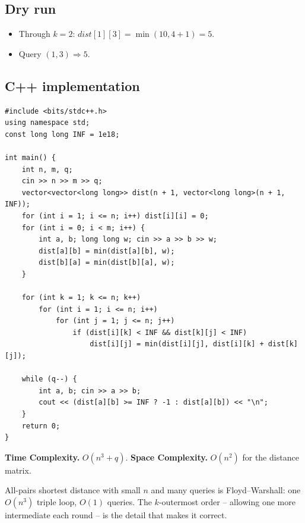 \subsection*{Dry run}


\begin{itemize}
  \item Through $k=2$: $\textit{dist}[1][3]=\min(10,4+1)=5$.
  \item Query $(1,3)\Rightarrow5$.
\end{itemize}

\subsection*{C++ implementation}

\begin{lstlisting}
#include <bits/stdc++.h>
using namespace std;
const long long INF = 1e18;

int main() {
    int n, m, q;
    cin >> n >> m >> q;
    vector<vector<long long>> dist(n + 1, vector<long long>(n + 1, INF));
    for (int i = 1; i <= n; i++) dist[i][i] = 0;
    for (int i = 0; i < m; i++) {
        int a, b; long long w; cin >> a >> b >> w;
        dist[a][b] = min(dist[a][b], w);
        dist[b][a] = min(dist[b][a], w);
    }

    for (int k = 1; k <= n; k++)
        for (int i = 1; i <= n; i++)
            for (int j = 1; j <= n; j++)
                if (dist[i][k] < INF && dist[k][j] < INF)
                    dist[i][j] = min(dist[i][j], dist[i][k] + dist[k][j]);

    while (q--) {
        int a, b; cin >> a >> b;
        cout << (dist[a][b] >= INF ? -1 : dist[a][b]) << "\n";
    }
    return 0;
}
\end{lstlisting}

\begin{complexitybox}
\textbf{Time Complexity.} $O(n^3+q)$. \textbf{Space Complexity.} $O(n^2)$
for the distance matrix.
\end{complexitybox}

\begin{takeawaybox}
All-pairs shortest distance with small $n$ and many queries is
Floyd--Warshall: one $O(n^3)$ triple loop, $O(1)$ queries. The
$k$-outermost order -- allowing one more intermediate each round -- is the
detail that makes it correct.
\end{takeawaybox}
